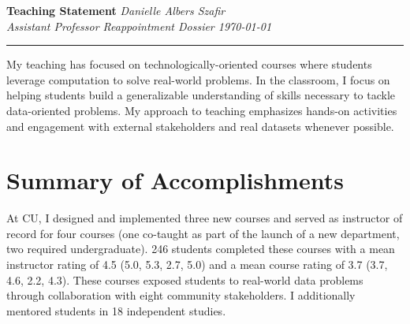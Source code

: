 \documentclass[11pt]{article}
\begin{document}
\setlength{\belowcaptionskip}{-10pt}

\thispagestyle{fancy}

\textbf{\Large Teaching Statement}
{\hspace{220pt}\emph{Danielle Albers Szafir\\Assistant Professor Reappointment Dossier \hspace{185pt}\today} \vspace{3pt}}
\hrule

My teaching has focused on technologically-oriented courses where students leverage computation to solve real-world problems. In the classroom, I focus on helping students build a generalizable understanding of skills necessary to tackle data-oriented problems. My approach to teaching emphasizes hands-on activities and engagement with external stakeholders and real datasets whenever possible. 

\section*{Summary of Accomplishments}

At CU, I designed and implemented three new courses and served as instructor of record for four courses (one co-taught as part of the launch of a new department, two required undergraduate). 246 students completed these courses with a mean instructor rating of 4.5 (5.0, 5.3, 2.7, 5.0) and a mean course rating of 3.7 (3.7, 4.6, 2.2, 4.3). These courses exposed students to real-world data problems through collaboration with eight community stakeholders. I additionally mentored students in 18 independent studies. 
\end{document}
